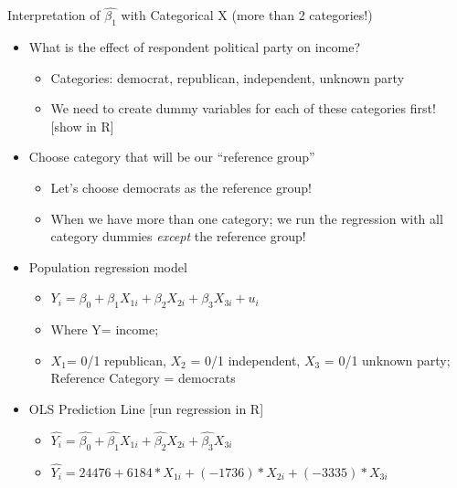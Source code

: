 \documentclass[
  8pt,
  ignorenonframetext,
  dvipsnames]{beamer}
\providecommand{\tightlist}{%
  \setlength{\itemsep}{0pt}\setlength{\parskip}{0pt}}
\let\olditem\item
\renewcommand{\item}{%
  \olditem\vspace{4pt}
}
\begin{document}
\begin{frame}{Interpretation of \(\hat{\beta_1}\) with Categorical X
(more than 2 categories!)}
\protect\hypertarget{interpretation-of-hatbeta_1-with-categorical-x-more-than-2-categories}{}

\begin{itemize}
\tightlist
\item
  What is the effect of respondent political party on income?

  \begin{itemize}
  \tightlist
  \item
    Categories: democrat, republican, independent, unknown party
  \item
    We need to create dummy variables for each of these categories
    first! {[}show in R{]}
  \end{itemize}
\end{itemize}

\medskip

\begin{itemize}
\tightlist
\item
  Choose category that will be our ``reference group''

  \begin{itemize}
  \tightlist
  \item
    Let's choose democrats as the reference group!
  \item
    When we have more than one category; we run the regression with all
    category dummies \emph{except} the reference group!
  \end{itemize}
\end{itemize}

\medskip

\begin{itemize}
\tightlist
\item
  Population regression model

  \begin{itemize}
  \tightlist
  \item
    \(Y_i = \beta_0 + \beta_1X_{1i} + \beta_2X_{2i} + \beta_3X_{3i} + u_i\)
  \item
    Where Y= income;
  \item
    \(X_{1}\)= 0/1 republican, \(X_{2}\) = 0/1 independent, \(X_{3}\) =
    0/1 unknown party; Reference Category = democrats
  \end{itemize}
\end{itemize}

\medskip

\begin{itemize}
\tightlist
\item
  OLS Prediction Line {[}run regression in R{]}

  \begin{itemize}
  \tightlist
  \item
    \(\hat{Y_i} = \hat{\beta_0} + \hat{\beta_1}X_{1i} + \hat{\beta_2}X_{2i} + \hat{\beta_3}X_{3i}\)
  \item
    \(\hat{Y_i} = 24476 + 6184*X_{1i} + (-1736)*X_{2i} + (-3335)*X_{3i}\)
  \end{itemize}
\end{itemize}

\end{frame}
\end{document}

